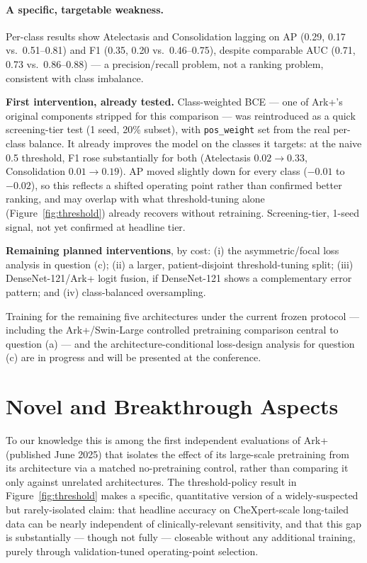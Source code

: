 \documentclass[11pt]{article}
\begin{document}
\paragraph{A specific, targetable weakness.} Per-class results show Atelectasis and Consolidation lagging on AP (0.29, 0.17 vs.\ 0.51--0.81) and F1 (0.35, 0.20 vs.\ 0.46--0.75), despite comparable AUC (0.71, 0.73 vs.\ 0.86--0.88) --- a precision/recall problem, not a ranking problem, consistent with class imbalance.

\textbf{First intervention, already tested.} Class-weighted BCE --- one of Ark+'s original components stripped for this comparison --- was reintroduced as a quick screening-tier test (1 seed, 20\% subset), with \texttt{pos\_weight} set from the real per-class balance. It already improves the model on the classes it targets: at the naive 0.5 threshold, F1 rose substantially for both (Atelectasis $0.02\!\to\!0.33$, Consolidation $0.01\!\to\!0.19$). AP moved slightly down for every class ($-0.01$ to $-0.02$), so this reflects a shifted operating point rather than confirmed better ranking, and may overlap with what threshold-tuning alone (Figure~\ref{fig:threshold}) already recovers without retraining. Screening-tier, 1-seed signal, not yet confirmed at headline tier.

\textbf{Remaining planned interventions}, by cost: (i) the asymmetric/focal loss analysis in question (c); (ii) a larger, patient-disjoint threshold-tuning split; (iii) DenseNet-121/Ark+ logit fusion, if DenseNet-121 shows a complementary error pattern; and (iv) class-balanced oversampling.

Training for the remaining five architectures under the current frozen protocol --- including the Ark+/Swin-Large controlled pretraining comparison central to question (a) --- and the architecture-conditional loss-design analysis for question (c) are in progress and will be presented at the conference.

\section*{Novel and Breakthrough Aspects}

To our knowledge this is among the first independent evaluations of Ark+ (published June 2025) that isolates the effect of its large-scale pretraining from its architecture via a matched no-pretraining control, rather than comparing it only against unrelated architectures. The threshold-policy result in Figure~\ref{fig:threshold} makes a specific, quantitative version of a widely-suspected but rarely-isolated claim: that headline accuracy on CheXpert-scale long-tailed data can be nearly independent of clinically-relevant sensitivity, and that this gap is substantially --- though not fully --- closeable without any additional training, purely through validation-tuned operating-point selection.
\end{document}
